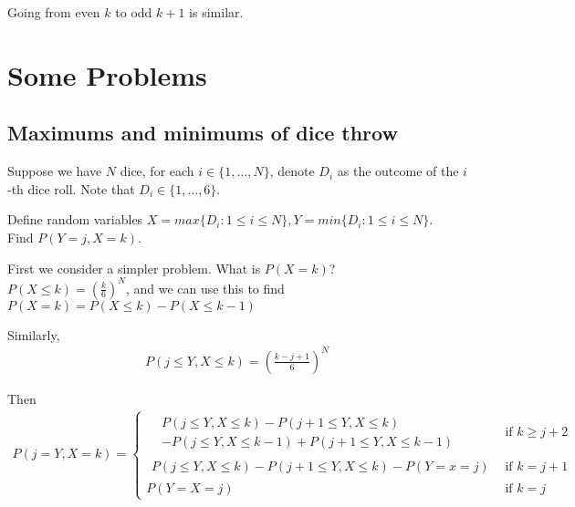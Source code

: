 \documentclass{article}
\begin{document}
Going from even $k$ to odd $k+1$ is similar.

\section{Some Problems}
\subsection{Maximums and minimums of dice throw}
Suppose we have $N$ dice, for each $i\in \{1,\dots,N\}$, denote $D_i$ as the outcome of the $i$-th dice roll. Note that $D_i\in \{1,\dots, 6\}$.

Define random variables $X=max\{D_i:1\leq i\leq N\}, Y=min\{D_i:1\leq i\leq N\}$.\\
Find $P(Y=j, X=k)$.

First we consider a simpler problem. What is $P(X=k)$?\\
$P(X\leq k)=(\frac{k}{6})^N$, and we can use this to find $P(X=k)=P(X\leq k) - P(X\leq k-1)$

Similarly, 
\begin{align*}
	P(j\leq Y, X\leq k)=(\frac{k-j+1}{6})^N
\end{align*}

Then 
\begin{align*}
	P(j=Y, X=k) = 
	\begin{cases}
	\begin{aligned}
	&P(j\leq Y, X\leq k) - P(j+1\leq Y, X\leq k) \\
	&- P(j\leq Y, X\leq k-1) + P(j+1\leq Y, X\leq k-1)
	\end{aligned} &\text{if } k\geq j+2\\
	\begin{aligned}
	P(j\leq Y, X\leq k) - P(j+1\leq Y, X\leq k) - P(Y=x=j)
	\end{aligned} &\text{if } k=j+1\\
	P(Y=X=j) &\text{if } k=j
	\end{cases}
\end{align*}
\end{document}

